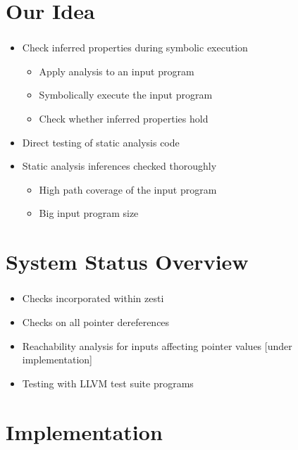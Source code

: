 \documentclass[mathserif,10pt]{beamer}
\begin{document}
\section{Our Idea}
\frame
{
  \frametitle{\secname}
  \begin{itemize} [<+->]
    \item Check inferred properties during symbolic execution
    \begin{itemize}
      \item Apply analysis to an input program
      \item Symbolically execute the input program
      \item Check whether inferred properties hold
    \end{itemize} 
    \vspace{1cm}
    \item Direct testing of static analysis code
    \vspace{1cm}
    \item Static analysis inferences checked thoroughly
    \begin{itemize}
      \item High path coverage of the input program
      \item Big input program size
    \end{itemize} 
  \end{itemize} 
}

\section{System Status Overview}
\frame
{
  \frametitle{\secname}
  \begin{itemize} [<+->]
    \item Checks incorporated within zesti
    \vspace{1cm}
    \item Checks on all pointer dereferences
    \vspace{1cm}
    \item Reachability analysis for inputs affecting pointer values [under implementation]
    \vspace{1cm}
    \item Testing with LLVM test suite programs
  \end{itemize} 
}

\section{Implementation}
\end{document}
